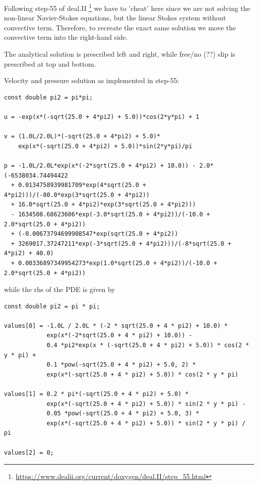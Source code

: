 Following step-55 of deal.II \footnote{\url{https://www.dealii.org/current/doxygen/deal.II/step_55.html}}
we have to 'cheat' here since we are not solving the non-linear Navier-Stokes equations, but the linear Stokes system without convective term. Therefore, to recreate the exact same solution
we move the convective term into the right-hand side.

The analytical solution is prescribed left and right, while free/no (??) slip is prescribed at top and bottom.

Velocity and pressure solution as implemented in step-55:
\begin{lstlisting}
const double pi2 = pi*pi;

u = -exp(x*(-sqrt(25.0 + 4*pi2) + 5.0))*cos(2*y*pi) + 1

v = (1.0L/2.0L)*(-sqrt(25.0 + 4*pi2) + 5.0)*
    exp(x*(-sqrt(25.0 + 4*pi2) + 5.0))*sin(2*y*pi)/pi

p = -1.0L/2.0L*exp(x*(-2*sqrt(25.0 + 4*pi2) + 10.0)) - 2.0*(-6538034.74494422 
  + 0.0134758939981709*exp(4*sqrt(25.0 + 4*pi2)))/(-80.0*exp(3*sqrt(25.0 + 4*pi2)) 
  + 16.0*sqrt(25.0 + 4*pi2)*exp(3*sqrt(25.0 + 4*pi2))) 
  - 1634508.68623606*exp(-3.0*sqrt(25.0 + 4*pi2))/(-10.0 + 2.0*sqrt(25.0 + 4*pi2)) 
  + (-0.00673794699908547*exp(sqrt(25.0 + 4*pi2)) 
  + 3269017.37247211*exp(-3*sqrt(25.0 + 4*pi2)))/(-8*sqrt(25.0 + 4*pi2) + 40.0) 
  + 0.00336897349954273*exp(1.0*sqrt(25.0 + 4*pi2))/(-10.0 + 2.0*sqrt(25.0 + 4*pi2))
\end{lstlisting}
while the rhs of the PDE is given by


\begin{lstlisting}
const double pi2 = pi * pi;

values[0] = -1.0L / 2.0L * (-2 * sqrt(25.0 + 4 * pi2) + 10.0) *
            exp(x*(-2*sqrt(25.0 + 4 * pi2) + 10.0)) -
            0.4 *pi2*exp(x * (-sqrt(25.0 + 4 * pi2) + 5.0)) * cos(2 * y * pi) +
            0.1 *pow(-sqrt(25.0 + 4 * pi2) + 5.0, 2) *
            exp(x*(-sqrt(25.0 + 4 * pi2) + 5.0)) * cos(2 * y * pi)

values[1] = 0.2 * pi*(-sqrt(25.0 + 4 * pi2) + 5.0) *
            exp(x*(-sqrt(25.0 + 4 * pi2) + 5.0)) * sin(2 * y * pi) -
            0.05 *pow(-sqrt(25.0 + 4 * pi2) + 5.0, 3) *
            exp(x*(-sqrt(25.0 + 4 * pi2) + 5.0)) * sin(2 * y * pi) / pi

values[2] = 0;
\end{lstlisting}

